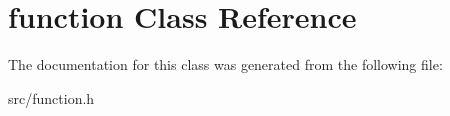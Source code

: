 \hypertarget{classfunction}{
\section{function Class Reference}
\label{classfunction}
}


The documentation for this class was generated from the following file:\begin{DoxyCompactItemize}
\item 
src/function.h\end{DoxyCompactItemize}
